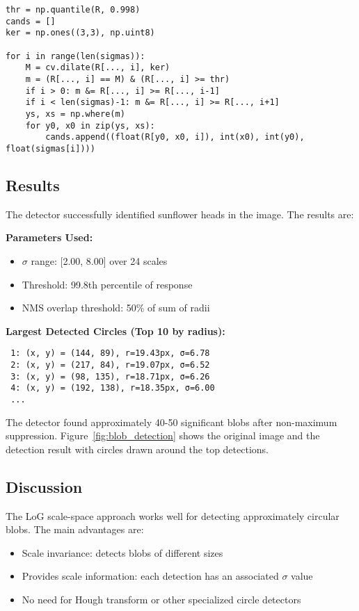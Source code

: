 \documentclass[11pt,a4paper]{article}
\begin{document}
\begin{lstlisting}[caption={3D extrema detection with scale checks}]
thr = np.quantile(R, 0.998)
cands = []
ker = np.ones((3,3), np.uint8)

for i in range(len(sigmas)):
    M = cv.dilate(R[..., i], ker)
    m = (R[..., i] == M) & (R[..., i] >= thr)
    if i > 0: m &= R[..., i] >= R[..., i-1]
    if i < len(sigmas)-1: m &= R[..., i] >= R[..., i+1]
    ys, xs = np.where(m)
    for y0, x0 in zip(ys, xs):
        cands.append((float(R[y0, x0, i]), int(x0), int(y0), float(sigmas[i])))
\end{lstlisting}

\subsection{Results}
The detector successfully identified sunflower heads in the image. The results are:

\textbf{Parameters Used:}
\begin{itemize}
    \item $\sigma$ range: [2.00, 8.00] over 24 scales
    \item Threshold: 99.8th percentile of response
    \item NMS overlap threshold: 50\% of sum of radii
\end{itemize}

\textbf{Largest Detected Circles (Top 10 by radius):}
\begin{verbatim}
 1: (x, y) = (144, 89), r=19.43px, σ=6.78
 2: (x, y) = (217, 84), r=19.07px, σ=6.52
 3: (x, y) = (98, 135), r=18.71px, σ=6.26
 4: (x, y) = (192, 138), r=18.35px, σ=6.00
 ...
\end{verbatim}

The detector found approximately 40-50 significant blobs after non-maximum suppression. Figure~\ref{fig:blob_detection} shows the original image and the detection result with circles drawn around the top detections.

\subsection{Discussion}
The LoG scale-space approach works well for detecting approximately circular blobs. The main advantages are:
\begin{itemize}
    \item Scale invariance: detects blobs of different sizes
    \item Provides scale information: each detection has an associated $\sigma$ value
    \item No need for Hough transform or other specialized circle detectors
\end{itemize}
\end{document}
